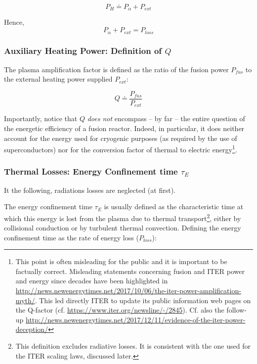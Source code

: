 \begin{equation}
P_{H} \doteq P_\alpha + P_{ext}
\label{eq:definition_net_power}
\end{equation}

\noindent
Hence, 
\begin{equation}
	P_\alpha + P_{ext} = P_{loss}
	\label{eq:power_balance_simplified}
\end{equation}

\subsubsection{Auxiliary Heating Power: Definition of $Q$}
The plasma amplification factor is defined as the ratio of the fusion power $P_{fus}$ to the external heating power supplied $P_{ext}$\cite[p.12]{Wesson2004}:

\begin{equation}
	Q \doteq \frac{P_{fus}}{P_{ext}}
\label{eq:definition_Q}
\end{equation}

Importantly, notice that $Q$ \emph{does not} encompass -- by far -- the entire question of the energetic efficiency of a fusion reactor. Indeed, in particular, it does neither account for the energy used for cryogenic purposes (as required by the use of superconductors) nor for the conversion factor of thermal to electric energy\footnote{This point is often misleading for the public and it is important to be factually correct. Misleading statements concerning fusion and ITER power and energy since decades have been highlighted in \url{http://news.newenergytimes.net/2017/10/06/the-iter-power-amplification-myth/}. This led directly ITER to update its public information web pages on the Q-factor (cf. \url{https://www.iter.org/newsline/-/2845}).  Cf. also the follow-up \url{http://news.newenergytimes.net/2017/12/11/evidence-of-the-iter-power-deception/}}.




\subsubsection{Thermal Losses: Energy Confinement time $\tau_E$}

It the following, radiations losses are neglected (at first). 

The energy confinement time $\tau_E$ is usually defined as the characteristic time at which this energy is lost from the plasma due to thermal transport\footnote{This definition excludes radiative losses. It is consistent with the one used for the ITER scaling laws, discussed later.}, either by collisional conduction or by turbulent thermal convection. Defining the energy confinement time as the rate of energy loss ($P_{loss}$)\cite[p.9]{Wesson2004}:

